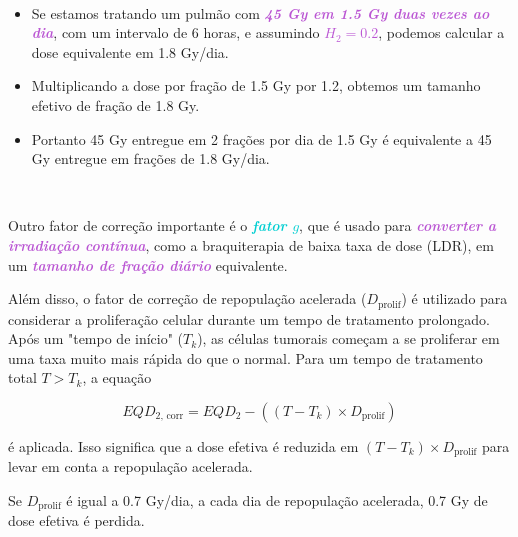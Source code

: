 \documentclass[11pt,a4paper]{article}
\begin{document}
	\

	\begin{tcolorbox}[width=\textwidth, colback={white}, colbacktitle={DarkTurquoise!50!white}, title={$\bigstar$ \LobsterTwo{Exemplo: Correção com } $\bigstar$}, coltitle={CarnationPink}, colframe={DarkTurquoise}, fonttitle=\rmfamily\bfseries\Large, breakable]

		\begin{itemize}[label=\textcolor{CarnationPink}{$\blacktriangleright$}]
			\item Se estamos tratando um pulmão com \textcolor{MediumOrchid}{\textbf{\textit{45 Gy em 1.5 Gy duas vezes ao dia}}}, com um intervalo de 6 horas, e assumindo \textcolor{MediumOrchid}{\textbf{\textit{$H_2 = 0.2$}}}, podemos calcular a dose equivalente em 1.8 Gy/dia. 
			\item Multiplicando a dose por fração de 1.5 Gy por 1.2, obtemos um tamanho efetivo de fração de 1.8 Gy. 
			\item Portanto 45 Gy entregue em 2 frações por dia de 1.5 Gy é equivalente a 45 Gy entregue em frações de 1.8 Gy/dia.
		\end{itemize}
	\end{tcolorbox}
	
	\

	Outro fator de correção importante é o \textcolor{DarkTurquoise}{\textbf{\textit{fator $g$}}}, que é usado para \textcolor{MediumOrchid}{\textbf{\textit{converter a irradiação contínua}}}, como a braquiterapia de baixa taxa de dose (LDR), em um \textcolor{MediumOrchid}{\textbf{\textit{tamanho de fração diário}}} equivalente.

	Além disso, o fator de correção de repopulação acelerada ($D_{\text{prolif}}$) é utilizado para considerar a proliferação celular durante um tempo de tratamento prolongado. Após um "tempo de início" ($T_k$), as células tumorais começam a se proliferar em uma taxa muito mais rápida do que o normal. Para um tempo de tratamento total $T > T_k$, a equação  
	
	\begin{equation}
		EQD_{\text{2, corr}} = EQD_2 - ((T - T_k) \times D_{\text{prolif}})
	\end{equation}

	\noindent é aplicada. Isso significa que a dose efetiva é reduzida em $(T - T_k) \times D_{\text{prolif}}$ para levar em conta a repopulação acelerada. 

	\begin{tcolorbox}[width=\textwidth, colback={white}, colbacktitle={DarkTurquoise!50!white}, title={$\bigstar$ \LobsterTwo{Exemplo: Correção População Acelerada} $\bigstar$}, coltitle={CarnationPink}, colframe={DarkTurquoise}, fonttitle=\rmfamily\bfseries\Large, breakable]

		Se $D_{\text{prolif}}$ é igual a 0.7 Gy/dia, a cada dia de repopulação acelerada, 0.7 Gy de dose efetiva é perdida.

	\end{tcolorbox}
\end{document}
